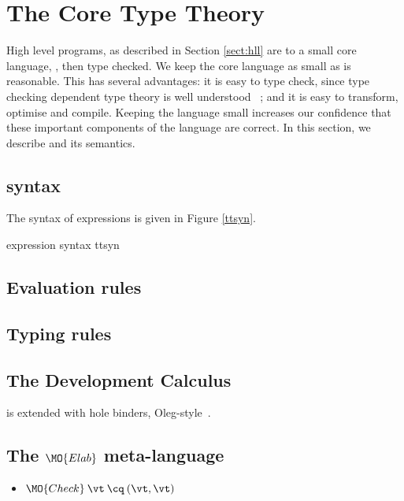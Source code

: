 \section{The Core Type Theory}

High level \Idris{} programs, as described in Section \ref{sect:hll} are 
 to a small core language, \TT{}, then type checked. We keep the
core language as small as is reasonable. This has several advantages: it is
easy to type check, since type checking dependent type theory is well understood
~\cite{loh2010tutorial}; and it is easy to transform, optimise and compile. Keeping
the language small increases our confidence that these important components of
the language are correct. In this section, we describe \TT{} and
its semantics.

\subsection{\TT{} syntax}

The syntax of \TT{} expressions is given in Figure \ref{ttsyn}.

{\TT{} expression syntax}
{ttsyn}

\subsection{Evaluation rules}

\subsection{Typing rules}

\subsection{The Development Calculus \TTdev}

\TTdev{} is \TT{} extended with hole binders, Oleg-style~\cite{McBride1999}. 

\subsection{The $\MO{Elab}$ meta-language}


\begin{itemize}
\item $\MO{Check}\:\vt\:\cq\:(\vt, \vt)$
\end{itemize}
